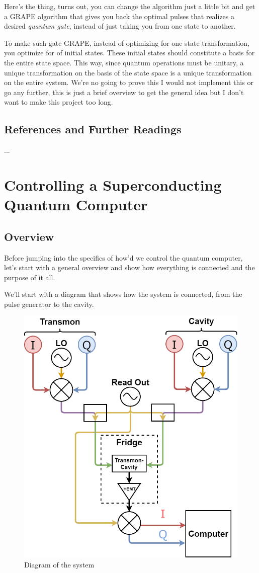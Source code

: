 \documentclass[english, a4paper, 12pt, twoside]{article}
\numberwithin{equation}{section} %
\begin{document}
Here's the thing, turns out, you can change the algorithm just a little bit and get a GRAPE algorithm that gives you back the optimal pulses that realizes a desired \textit{quantum gate}, instead of just taking you from one state to another. 

To make such gate GRAPE, instead of optimizing for one state transformation, you optimize for of initial states. These initial states should constitute a basis for the entire state space. This way, since quantum operations must be unitary, a unique transformation on the basis of the state space is a unique transformation on the entire system. We're no going to prove this I would not implement this or go any further, this is just a brief overview to get the general idea but I don't want to make this project too long.

\subsection{References and Further Readings}
...

\newpage
\section{Controlling a Superconducting Quantum Computer} \label{chap:FPGA}
\subsection{Overview}
Before jumping into the specifics of how'd we control the quantum computer, let's start with a general overview and show how everything is connected and the purpose of it all.

We'll start with a diagram that shows how the system is connected, from the pulse generator to the cavity.

\begin{figure}[H]
    \centering
    \includegraphics[width=0.8\columnwidth]{system-diagram.png}
    \caption{Diagram of the system}
    \label{fig:System-diagram}
\end{figure}
\end{document}

